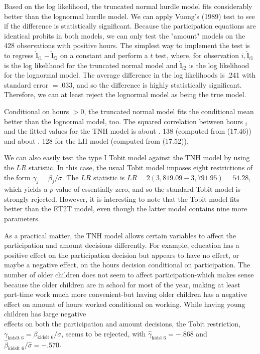 \documentclass[10pt]{article}
\begin{document}
Based on the log likelihood, the truncated normal hurdle model fits considerably better than the lognormal hurdle model. We can apply Vuong's (1989) test to see if the difference is statistically significant. Because the participation equations are identical probits in both models, we can only test the "amount" models on the 428 observations with positive hours. The simplest way to implement the test is to regress $\hat{\boldsymbol{l}}_{i 1}-\hat{\boldsymbol{l}}_{i 2}$ on a constant and perform a $t$ test, where, for observation $i, \hat{\boldsymbol{l}}_{i 1}$ is the log likelihood for the truncated normal model and $\hat{\boldsymbol{l}}_{i 2}$ is the log likelihood for the lognormal model. The average difference in the log likelihoods is .241 with standard error $=.033$, and so the difference is highly statistically significant. Therefore, we can at least reject the lognormal model as being the true model.

Conditional on hours $>0$, the truncated normal model fits the conditional mean better than the lognormal model, too. The squared correlation between hours ${ }_{i}$ and the fitted values for the TNH model is about . 138 (computed from (17.46)) and about . 128 for the LH model (computed from (17.52)).

We can also easily test the type I Tobit model against the TNH model by using the $L R$ statistic. In this case, the usual Tobit model imposes eight restrictions of the form $\gamma_{j}=\beta_{j} / \sigma$. The $L R$ statistic is $L R=2(3,819.09-3,791.95)=54.28$, which yields a $p$-value of essentially zero, and so the standard Tobit model is strongly rejected. However, it is interesting to note that the Tobit model fits better than the ET2T model, even though the latter model contains nine more parameters.

As a practical matter, the TNH model allows certain variables to affect the participation and amount decisions differently. For example, education has a positive effect on the participation decision but appears to have no effect, or maybe a negative effect, on the hours decision conditional on participation. The number of older children does not seem to affect participation-which makes sense because the older children are in school for most of the year, making at least part-time work much more convenient-but having older children has a negative effect on amount of hours worked conditional on working. While having young children has large negative\\
effects on both the participation and amount decisions, the Tobit restriction, $\gamma_{\text {kidslt } 6}=\beta_{\text {kidslt } 6} / \sigma$, seems to be rejected, with $\hat{\gamma}_{\text {kidsl } 6}=-.868$ and $\hat{\beta}_{\text {kidslt } 6} / \hat{\sigma}=-.570$.
\end{document}
